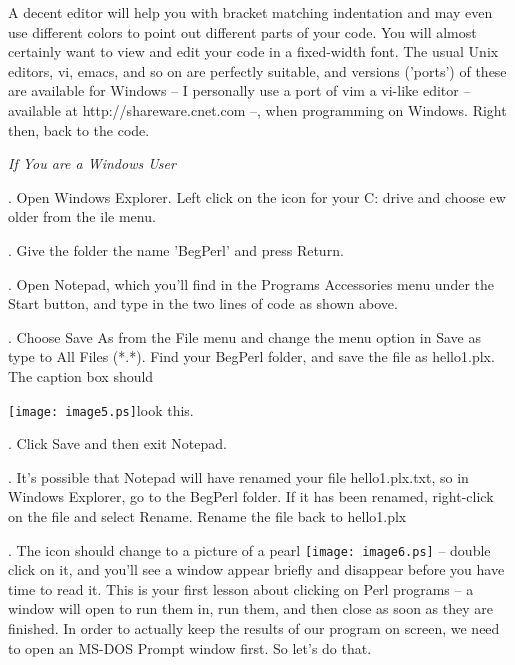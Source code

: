 \documentclass[a4paper,11pt]{book}
\begin{document}
\noindent 

\noindent A decent editor will help you with bracket matching indentation and may even use different colors to point out different parts of your code. You will almost certainly want to view and edit your code in a fixed-width font. The usual Unix editors, vi, emacs, and so on are perfectly suitable, and versions ('ports') of these are available for Windows -- I personally use a port of vim a vi-like editor -- available at http://shareware.cnet.com --, when programming on Windows. Right then, back to the code.

\noindent \textit{If You are a Windows User}

. Open Windows Explorer. Left click on the icon for your C: drive and choose ew \textbar {}older from the ile menu.

. Give the folder the name 'BegPerl' and press Return.

. Open Notepad, which you'll find in the Programs \textbar Accessories menu under the Start button, and type in the two lines of code as shown above.

. Choose Save As from the File menu and change the menu option in Save as type to All Files (*.*). Find your BegPerl folder, and save the file as hello1.plx. The caption box should

\noindent \texttt{[image: image5.ps]}look this.

\noindent 

. Click Save and then exit Notepad.

. It's possible that Notepad will have renamed your file hello1.plx.txt, so in Windows Explorer, go to the BegPerl folder. If it has been renamed, right-click on the file and select Rename. Rename the file back to hello1.plx

. The icon should change to a picture of a pearl \texttt{[image: image6.ps]} -- double click on it, and you'll see a window appear briefly and disappear before you have time to read it. This is your first lesson about clicking on Perl programs -- a window will open to run them in, run them, and then close as soon as they are finished. In order to actually keep the results of our program on screen, we need to open an MS-DOS Prompt window first. So let's do that.
\end{document}
